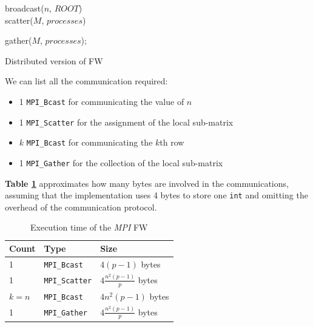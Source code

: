\begin{algorithm}[h!]

\SetAlgoLined

broadcast($n$, $ROOT$) \\
scatter($M$, $processes$)

gather($M$, $processes$);
 
\caption{Distributed version of FW}\label{alg:mpi}
\end{algorithm}


We can list all the communication required:
\begin{itemize}
\item{1 \texttt{MPI\_Bcast} for communicating the value of $n$}
\item{1 \texttt{MPI\_Scatter} for the assignment of the local sub-matrix}
\item{$k$ \texttt{MPI\_Bcast} for communicating the $k$th row}
\item{1 \texttt{MPI\_Gather} for the collection of the local sub-matrix}
\end{itemize}

\textbf{Table \ref*{tab:comm}} approximates how many bytes are involved in the communications, assuming that
the implementation uses 4 bytes to store one \texttt{int} and omitting the overhead of the communication protocol.
\begin{table}[h!]
\centering
\begin{tabular}{|l|l|l|}
\hline
\rowcolor[HTML]{F56B00} 
{\color[HTML]{FFFFFF} \textbf{Count}} & {\color[HTML]{FFFFFF} \textbf{Type}} & {\color[HTML]{FFFFFF} \textbf{Size}} \\ \hline
1                                     &  \texttt{MPI\_Bcast}                 &  $4(p-1)$ bytes                      \\ \hline
1                                     &  \texttt{MPI\_Scatter}               &  $4\frac{n^2(p-1)}{p}$ bytes         \\ \hline
$k = n$                               &  \texttt{MPI\_Bcast}                 &  $4n^2(p-1)$ bytes                    \\ \hline
1                                     &  \texttt{MPI\_Gather}                &  $4\frac{n^2(p-1)}{p}$ bytes         \\ \hline
\end{tabular}
\caption{Execution time of the \emph{MPI} FW}                                                                                                                                            
\label{tab:comm}
\end{table}
\par

